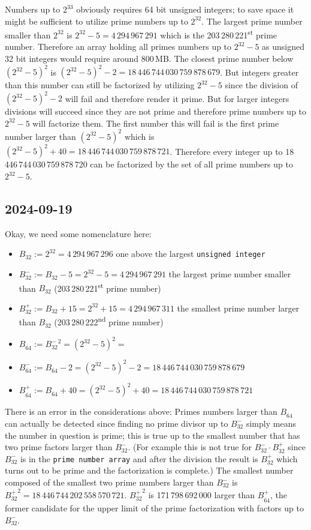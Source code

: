 \documentclass[a4paper,10pt]{article}
\begin{document}
Numbers up to $2^{33}$ obviously requires 64 bit unsigned integers;
to save space it might be sufficient to utilize prime numbers up to $2^{32}$.
The largest prime number smaller than $2^{32}$ is $2^{32} - 5 = 4\,294\,967\,291$
which is the 203\,280\,221\textsuperscript{st} prime number.
Therefore an array holding all primes numbers up to $2^{32} - 5$ as unsigned 32 bit integers would require around 800\,MB.
The closest prime number below $(2^{32} - 5)^2$ is $(2^{32} - 5)^2 - 2 = 18\,446\,744\,030\,759\,878\,679$.
But integers greater than this number can still be factorized by utilizing $2^{32} - 5$
since the division of $(2^{32} - 5)^2 - 2$ will fail
and therefore render it prime.
But for larger integers divisions will succeed
since they are not prime and therefore prime numbers up to $2^{32} - 5$ will factorize them.
The first number this will fail is the first prime number larger than $(2^{32} - 5)^2$
which is $(2^{32} - 5)^2 + 40 = 18\,446\,744\,030\,759\,878\,721$.
Therefore every integer up to 18\,446\,744\,030\,759\,878\,720 can be factorized by the set of all prime numbers up to $2^{32} - 5$.

\subsection*{2024-09-19}
Okay, we need some nomenclature here:
\begin{itemize}
 \item $B_{32} := 2^{32} = 4\,294\,967\,296$ one above the largest \texttt{unsigned integer}
 \item $B^-_{32} := B_{32} - 5 = 2^{32} - 5 = 4\,294\,967\,291$ the largest prime number smaller than $B_{32}$ (203\,280\,221\textsuperscript{st} prime number)
 \item $B^+_{32} := B_{32} + 15 = 2^{32} + 15 = 4\,294\,967\,311$ the smallest prime number larger than $B_{32}$ (203\,280\,222\textsuperscript{nd} prime number)
 \item $B_{\dot{64}} := {B^-_{32}}^2 = (2^{32} - 5)^2 = $
 \item $B^-_{\dot{64}} := B_{\dot{64}} - 2 = (2^{32} - 5)^2 - 2 = 18\,446\,744\,030\,759\,878\,679$
 \item $B^+_{\dot{64}} := B_{\dot{64}} + 40 = (2^{32} - 5)^2 + 40 = 18\,446\,744\,030\,759\,878\,721$
\end{itemize}


There is an error in the considerations above:
Primes numbers larger than $B_{\dot{64}}$ can actually be detected
since finding no prime divisor up to $B^-_{32}$ simply means the number in question is prime;
this is true up to the smallest number that has two prime factors larger than $B^-_{32}$.
(For example this is not true for $B^-_{32}\cdot B^+_{32}$
since $B^-_{32}$ is in the \texttt{prime number array}
and after the division the result is $B^+_{32}$ which turns out to be prime and the factorization is complete.)
The smallest number composed of the smallest two prime numbers larger than $B^-_{32}$ is ${B^+_{32}}^2 = 18\,446\,744\,202\,558\,570\,721$.
${B^+_{32}}^2$ is 171\,798\,692\,000 larger than $B^+_{\dot{64}}$,
the former candidate for the upper limit of the prime factorization with factors up to $B^-_{32}$.
\end{document}
